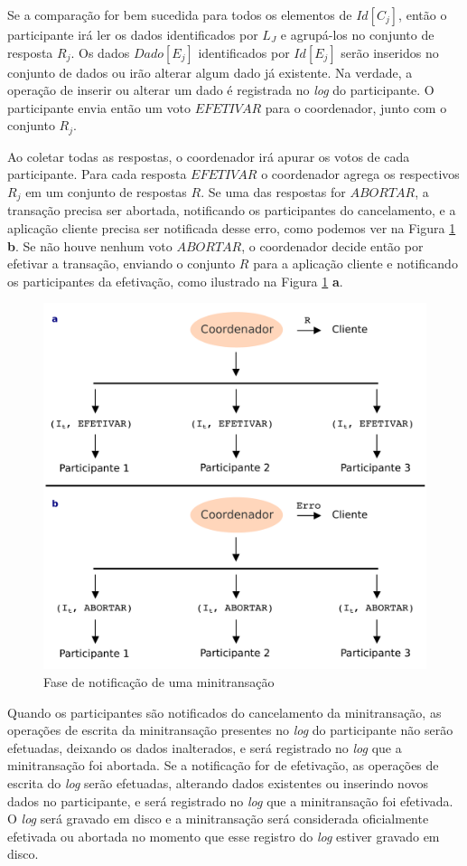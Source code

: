 \documentclass[11pt,twoside,a4paper]{book}
\begin{document}
Se a comparação for bem sucedida para todos os elementos de $Id[C_j]$, então o participante irá ler os dados identificados por $L_J$ e agrupá-los no conjunto de resposta $R_j$. Os dados $Dado[E_j]$ identificados por $Id[E_j]$ serão inseridos no conjunto de dados ou irão alterar algum dado já existente. Na verdade, a operação de inserir ou alterar um dado é registrada no \emph{log} do participante. O participante envia então um voto $EFETIVAR$ para o coordenador, junto com o conjunto $R_j$. 

Ao coletar todas as respostas, o coordenador irá apurar os votos de cada participante. Para cada resposta $EFETIVAR$ o coordenador agrega os respectivos $R_j$ em um conjunto de respostas $R$. Se uma das respostas for $ABORTAR$, a transação precisa ser abortada, notificando os participantes do cancelamento, e a aplicação cliente precisa ser notificada desse erro, como podemos ver na Figura \ref{fig:minitransacao_2fase} \textbf{b}. Se não houve nenhum voto $ABORTAR$, o coordenador decide então por efetivar a transação, enviando o conjunto $R$ para a aplicação cliente e notificando os participantes da efetivação, como ilustrado na Figura \ref{fig:minitransacao_2fase} \textbf{a}.

\begin{figure}
  \centering
  \includegraphics[width=.65\textwidth]{minitransacao_2fase} 
  \caption{Fase de notificação de uma minitransação}
  \label{fig:minitransacao_2fase} 
\end{figure}

Quando os participantes são notificados do cancelamento da minitransação, as operações de escrita da minitransação presentes no \emph{log} do participante não serão efetuadas, deixando os dados inalterados, e será registrado no \emph{log} que a minitransação foi abortada. Se a notificação for de efetivação, as operações de escrita do \emph{log} serão efetuadas, alterando dados existentes ou inserindo novos dados no participante, e será registrado no \emph{log} que a minitransação foi efetivada. O \emph{log} será gravado em disco e a minitransação será considerada oficialmente efetivada ou abortada no momento que esse registro do \emph{log} estiver gravado em disco.
\end{document}
